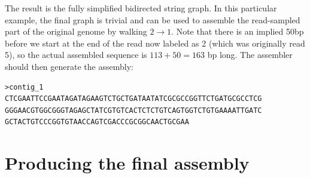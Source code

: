 \documentclass[12pt]{article}
\begin{document}

The result is the fully simplified bidirected string graph.  In this particular
example, the final graph is trivial and can be used to assemble the read-sampled
part of the original genome by walking $2 \to 1$.  Note that there is an implied
50bp before we start at the end of the read now labeled as 2 (which was
originally read 5), so the actual assembled sequence is $113 + 50 = 163$ bp
long.  The assembler should then generate the assembly:

\begin{verbatim}
>contig_1
CTCGAATTCCGAATAGATAGAAGTCTGCTGATAATATCGCGCCGGTTCTGATGCGCCTCG
GGGAACGTGGCGGGTAGAGCTATCGTGTCACTCTCTGTCAGTGGTCTGTGAAAATTGATC
GCTACTGTCCCGGTGTAACCAGTCGACCCGCGGCAACTGCGAA
\end{verbatim}

\section{Producing the final assembly}
\end{document}
